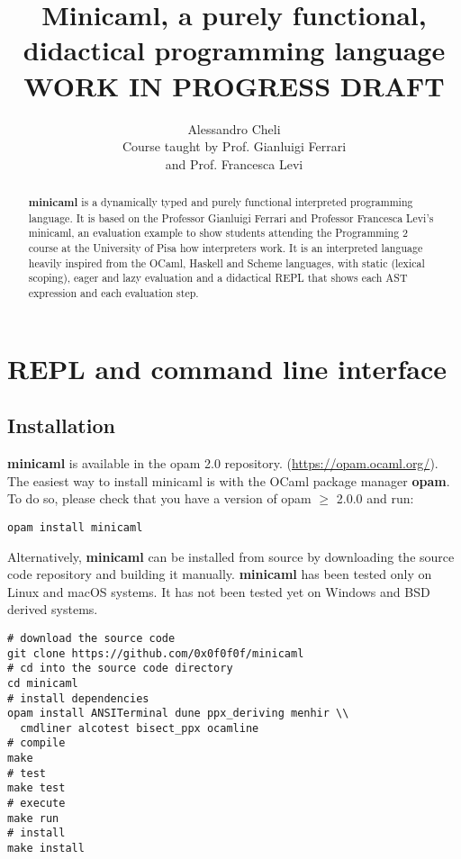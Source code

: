 \documentclass[a4paper, 10pt]{article}
\title{Minicaml, a purely functional, didactical programming language\\WORK IN PROGRESS DRAFT}
\author{Alessandro Cheli\\Course taught by Prof. Gianluigi Ferrari\\and Prof. Francesca Levi}
\theoremstyle{plain}%
\theoremstyle{definition}
\theoremstyle{remark}
\begin{document}
\maketitle

\begin{abstract}
\textbf{minicaml} is a dynamically typed and purely functional interpreted
programming language. It is based on the Professor Gianluigi Ferrari and
Professor Francesca Levi's minicaml, an evaluation example to show students
attending the Programming 2 course at the University of Pisa how interpreters
work. It is an interpreted language heavily inspired from the OCaml, Haskell and
Scheme languages, with static (lexical scoping), eager and lazy evaluation and a
didactical REPL that shows each AST expression and each evaluation step.
\end{abstract}

\section{REPL and command line interface}
\subsection{Installation}
\textbf{minicaml} is available in the opam 2.0 repository.
(\url{https://opam.ocaml.org/}). The easiest way to install minicaml is with the
OCaml package manager \textbf{opam}. To do so, please check that you have a version of opam $\geq$
2.0.0 and run:
\begin{lstlisting}[style=bash]
opam install minicaml
\end{lstlisting}
Alternatively, \textbf{minicaml} can be installed from source by downloading the
source code repository and building it manually. \textbf{minicaml} has been tested
only on Linux and macOS systems. It has not been tested yet on Windows and BSD
derived systems.
\begin{lstlisting}[style=bash]
# download the source code
git clone https://github.com/0x0f0f0f/minicaml
# cd into the source code directory
cd minicaml
# install dependencies
opam install ANSITerminal dune ppx_deriving menhir \\
  cmdliner alcotest bisect_ppx ocamline
# compile
make
# test
make test
# execute
make run
# install
make install
\end{lstlisting}

\clearpage
\end{document}
